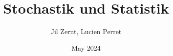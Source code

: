 \documentclass[a4paper, fontsize = 8pt, landscape]{scrartcl}
\title{Stochastik und Statistik}
\author{Jil Zernt, Lucien Perret}
\date{May 2024}
\begin{document}
\begin{multicols}{3}
	\thispagestyle{TitlePageStyle}
	\maketitle
	\raggedcolumns
\end{multicols}
\end{document}
